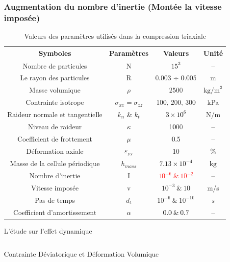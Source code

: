 \documentclass[a4paper,12pt]{report}
\begin{document}
\subsubsection{Augmentation du nombre d'inertie (Montée la vitesse imposée)}
    \begin{table}
    \centering
    \begin{table}
    \centering
    \begin{tabular}{|c|c|c|c|}
    \hline
    \textbf{Symboles} & \textbf{Paramètres} & \textbf{Valeurs} & \textbf{Unité} \\ 
    \hline
    Nombre de particules & N & $15^3$ & -- \\  
    \hline
    Le rayon des particules & R & 0.003 $\div$ 0.005 & m \\  
    \hline
    Masse volumique & $\rho$  & 2500 & $\text{kg/m}^3$ \\
    \hline
    Contrainte isotrope & $\sigma_{xx} = \sigma_{zz}$ & 100, 200, 300 & kPa \\ 
    \hline
    Raideur normale et tangentielle & $k_n$ \& $k_t$ & \textcolor{black}{$3 \times 10^6$} & $\text{N/m}$ \\ 
    \hline
    Niveau de raideur & $\kappa$ & 1000 & -- \\ 
    \hline
    Coefficient de frottement & $\mu$ & 0.5 & -- \\ 
    \hline
    Déformation axiale & $\varepsilon_{\text{yy}}$ &  10 & $\%$ \\ 
    \hline
    Masse de la cellule périodique  & $h_{mass}$ &   \textcolor{black}{$7.13 \times 10^{-4}$}  & $\text{kg}$ \\ 
    \hline
    Nombre d’inertie & I & \textcolor{red}{$10^{-6}\  \& \ 10^{-2}$} & -- \\ 
    \hline
    Vitesse imposée & v & $10^{-3}\  \& \ 10 $ & m/s \\ 
    \hline
    Pas de temps & $d_t$  & $10^{-6}\  \& \ 10^{-10}$ & $\text{s}$\\
    \hline
    Coefficient d'amortissement & $\alpha$  & \textcolor{black}{$0.0 \ \& \ 0.7$} & --\\
    \hline
    \end{tabular}
    \caption{Valeurs des paramètres utilisés dans la compression triaxiale}
    \end{table}

                                    \begin{frame}{L'étude sur l'effet dynamique}
    \begin{columns}
        \begin{column}{0.5\textwidth}
            \centering
            \scalebox{0.5}{}
            \vspace{0.5em}
            \centering
            {\small Contrainte Déviatorique et Déformation Volumique}
        \end{column}
            

\end{columns}
\end{frame}
\end{table}
\end{document}
